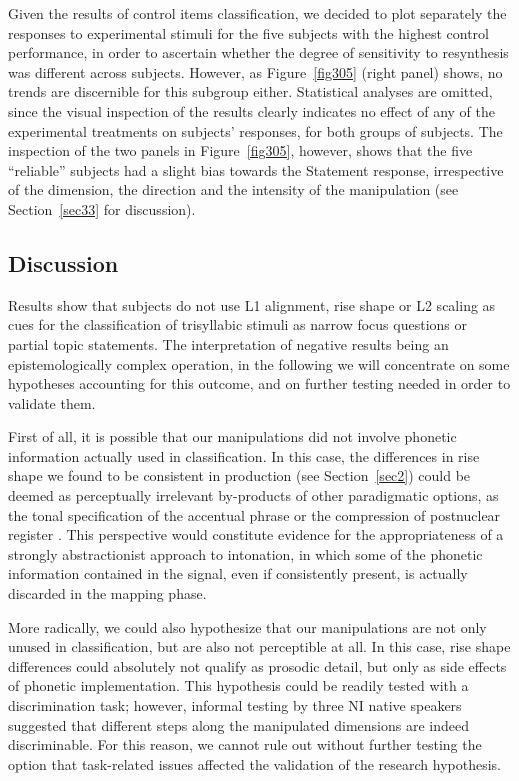 Given the results of control items classification, we decided to plot separately the responses to experimental stimuli for the five subjects with the highest control performance, in order to ascertain whether the degree of sensitivity to resynthesis was different across subjects. However, as Figure~\ref{fig305} (right panel) shows, no trends are discernible for this subgroup either. Statistical analyses are omitted, since the visual inspection of the results clearly indicates no effect of any of the experimental treatments on subjects' responses, for both groups of subjects. The inspection of the two panels in Figure~\ref{fig305}, however, shows that the five ``reliable'' subjects had a slight bias towards the Statement response, irrespective of the dimension, the direction and the intensity of the manipulation (see Section~\ref{sec33} for discussion).

\subsection{Discussion}\label{sec323}
Results show that subjects do not use L1 alignment, rise shape or L2 scaling as cues for the classification of trisyllabic stimuli as narrow focus questions or partial topic statements. The interpretation of negative results being an epistemologically complex operation, in the following we will concentrate on some hypotheses accounting for this outcome, and on further testing needed in order to validate them.

First of all, it is possible that our manipulations did not involve phonetic information actually used in classification. In this case, the differences in rise shape we found to be consistent in production (see Section~\ref{sec2}) could be deemed as perceptually irrelevant by-products of other paradigmatic options, as the tonal specification of the accentual phrase \citep{petrone2008tonal} or the compression of postnuclear register \citep{dimperio2011phrasing}. This perspective would constitute evidence for the appropriateness of a strongly abstractionist approach to intonation, in which some of the phonetic information contained in the signal, even if consistently present, is actually discarded in the mapping phase.

More radically, we could also hypothesize that our manipulations are not only unused in classification, but are also not perceptible at all. In this case, rise shape differences could absolutely not qualify as prosodic detail, but only as side effects of phonetic implementation. This hypothesis could be readily tested with a discrimination task; however, informal testing by three NI native speakers suggested that different steps along the manipulated dimensions are indeed discriminable. For this reason, we cannot rule out without further testing the option that task-related issues affected the validation of the research hypothesis. 

